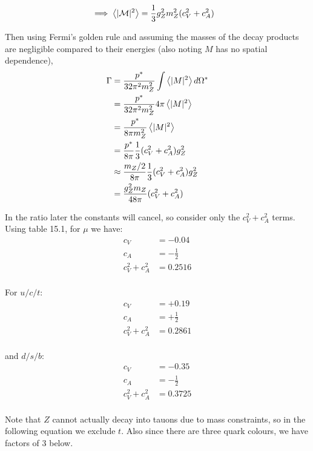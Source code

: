 \begin{align*}
    \implies \expval{|\mathcal{M}|^2} &= \frac{1}{3}g_Z^2 m_Z^2(c_V^2 + c_A^2)
\end{align*}

Then using Fermi's golden rule and assuming the masses of the decay products are negligible compared to their energies (also noting $M$ has no spatial dependence),
\begin{align*}
    \Gamma &= \frac{p^*}{32\pi^2 m_Z^2} \int \expval{|M|^2} d\Omega^* \\
    &= \frac{p^*}{32\pi^2 m_Z^2} 4\pi \expval{|M|^2} \\
    &= \frac{p^*}{8\pi m_Z^2} \expval{|M|^2} \\
    &= \frac{p^*}{8\pi }\frac{1}{3} (c_V^2 + c_A^2) g_Z^2 \\
    &\approx \frac{m_Z/2}{8\pi }\frac{1}{3} (c_V^2 + c_A^2) g_Z^2 \\
    &= \frac{g_Z^2 m_Z}{48\pi} (c_V^2 + c_A^2) \\
\end{align*}

In the ratio later the constants will cancel, so consider only the $c_V^2 + c_A^2$ terms. Using table 15.1, for $\mu$ we have:
\begin{align*}
    c_V &= -0.04 \\
    c_A &= -\frac{1}{2} \\
    c_V^2 + c_A^2 &= 0.2516 \\
\end{align*}

For $u/c/t$:
\begin{align*}
    c_V &= +0.19 \\
    c_A &= +\frac{1}{2} \\
    c_V^2 + c_A^2 &= 0.2861 \\
\end{align*}

and $d/s/b$:
\begin{align*}
    c_V &= -0.35 \\
    c_A &= -\frac{1}{2} \\
    c_V^2 + c_A^2 &= 0.3725 \\
\end{align*}

Note that $Z$ cannot actually decay into tauons due to mass constraints, so in the following equation we exclude $t$. Also since there are three quark colours, we have factors of 3 below.

